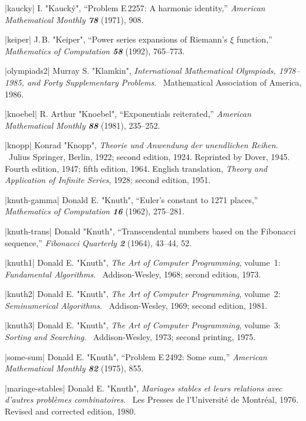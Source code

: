 \bib|kaucky|%
I. "Kauck\'y", ``Problem E\,2257: A harmonic identity,''
{\sl American Mathematical Monthly\/ \bf78} (1971), 908.


\bib|keiper|%
J.\,B. "Keiper", ``Power series expansions of Riemann's $\xi$ function,''
{\sl Mathematics of Computation\/ \bf58} (1992), 765--773.

\bib|olympiads2|%
Murray S. "Klamkin", {\sl International Mathematical Olympiads, 1978--1985, and
Forty Supplementary Problems}. \ Mathematical Association of America, 1986.

\bib|knoebel|%
R. Arthur "Knoebel", ``Exponentials reiterated,'' {\sl American
Mathematical Monthly\/ \bf88} (1981), 235--252.

\bib|knopp|%
Konrad "Knopp", {\sl Theorie und Anwendung der unendlichen Reihen}. \
Julius Springer, Berlin, 1922; second edition, 1924.
Reprinted by Dover, 1945. Fourth edition, 1947; fifth edition, 1964. English
translation, {\sl Theory and Application of Infinite Series},
1928; second edition, 1951.

\bib|knuth-gamma|%
Donald E. "Knuth", ``Euler's constant to 1271 places,''
{\sl Mathematics of Computation\/ \bf16} (1962), 275--281.

\bib|knuth-trans|%
Donald "Knuth", ``Transcendental numbers based on the Fibonacci
sequence,'' {\sl Fibonacci Quarterly\/ \bf2} (1964), 43--44, 52.

\bib|knuth1|%
Donald E. "Knuth", {\sl The Art of Computer Programming},
volume~1: {\sl Fundamental Algorithms}. \
Addison-Wesley, 1968; second edition, 1973.

\bib|knuth2|%
Donald E. "Knuth", {\sl The Art of Computer Programming},
volume~2: {\sl Semi\-numerical Algorithms}. \
Addison-Wesley, 1969; second edition, 1981.

\bib|knuth3|%
Donald E. "Knuth", {\sl The Art of Computer Programming},
volume~3: {\sl Sorting and Searching}. \
Addison-Wesley, 1973; second printing, 1975.


\bib|some-sum|%
Donald E. "Knuth", ``Problem E\,2492: Some sum,''
{\sl American Mathematical Monthly\/ \bf82} (1975), 855.

\bib|mariage-stables|%
Donald E. "Knuth", {\sl Mariages stables et leurs relations avec d'autres
probl\`emes combinatoires}. \
Les Presses de l'Universit\'e de Montr\'eal, 1976. Revised and corrected
edition, 1980.

